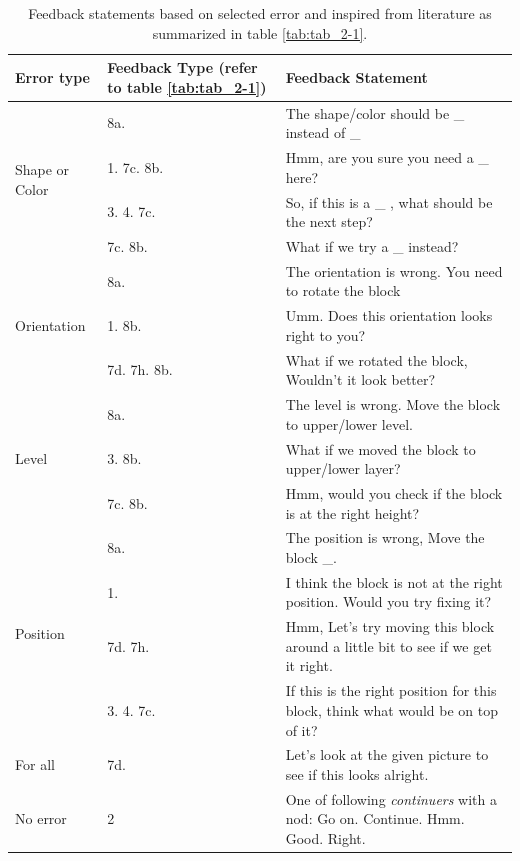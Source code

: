 \begin{table}[]
    \centering
\begin{tabular}{ | m{2cm} | m{3cm}| m{8cm} | } 
\hline
\textbf{Error type} & \textbf{Feedback Type} (refer to table \ref{tab:tab_2-1}) & \textbf{Feedback Statement} \\ 
\hline
\multirow{4}{4em}{Shape or Color}  & 8a. & The shape/color should be \_ instead of \_ \\ \cline{2-3}
& 1. 7c. 8b. & Hmm, are you sure you need a \_ here? \\ \cline{2-3}
& 3. 4. 7c. & So, if this is a \_ , what should be the next step?\\ \cline{2-3}
& 7c. 8b. & What if we try a \_ instead?\\ \cline{2-3}
\hline
\multirow{3}{4em}{Orientation}  & 8a. & The orientation is wrong. You need to rotate the block \\ \cline{2-3}
& 1. 8b. & Umm. Does this orientation looks right to you? \\\cline{2-3}
& 7d. 7h. 8b.  & What if we rotated the block, Wouldn't it look better? \\
\hline
\multirow{3}{4em}{Level}  & 8a. & The level is wrong. Move the block to upper/lower level. \\ \cline{2-3}
& 3. 8b. & What if we moved the block to upper/lower layer?\\ \cline{2-3}
& 7c. 8b. & Hmm, would you check if the block is at the right height?\\ 
\hline
\multirow{4}{4em}{Position}  & 8a. & The position is wrong, Move the block \_.  \\ \cline{2-3}
& 1. & I think the block is not at the right position. Would you try fixing it?\\ \cline{2-3}
& 7d. 7h. & Hmm, Let's try moving this block around a little bit to see if we get it right.\\ \cline{2-3}
& 3. 4. 7c. & If this is the right position for this block, think what would be on top of it?\\ 
\hline
For all  & 7d. & Let's look at the given picture to see if this looks alright. \\ 
\hline
No error & 2 & One of following \emph{continuers} with a nod: Go on. Continue. Hmm. Good. Right. \\
\hline
\end{tabular}
  \caption{Feedback statements based on selected error and inspired from literature as summarized in table \ref{tab:tab_2-1}.}
    \label{tab:tab_3-1}
\end{table}

